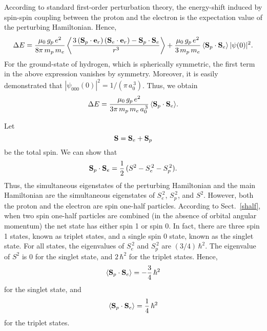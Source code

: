 According to standard first-order perturbation theory, the energy-shift induced
by spin-spin coupling between the proton and the electron is the expectation
value of the perturbing Hamiltonian. Hence,
\begin{equation}
\Delta E = \frac{\mu_0\,g_p\,e^2}{8\pi\,m_p\,m_e}\left\langle\frac{3\,({\bf S}_p\cdot{\bf e}_r)\,({\bf S}_e\cdot{\bf e}_r) - {\bf S}_p\cdot{\bf S}_e}{r^3}\right\rangle+ \frac{\mu_0\,g_p\,e^2}{3\,m_p\,m_e}\,\langle{\bf S}_p\cdot{\bf S}_e\rangle\,|\psi(0)|^2.
\end{equation}
For the ground-state of hydrogen, which is spherically symmetric,
the first term in the above expression vanishes by symmetry. 
Moreover, it is easily demonstrated that $|\psi_{000}(0)|^2=
1/(\pi\,a_0^{\,3})$. Thus, we obtain
\begin{equation}
\Delta E = \frac{\mu_0\,g_p\,e^2}{3\pi\,m_p\,m_e\,a_0^{\,3}}\,\langle{\bf S}_p\cdot{\bf S}_e\rangle.
\end{equation}

Let
\begin{equation}
{\bf S} = {\bf S}_e + {\bf S}_p
\end{equation}
be the total spin. We can show that
\begin{equation}
{\bf S}_p\cdot{\bf S}_e = \frac{1}{2}\,(S^2-S_e^{\,2}-S_p^{\,2}).
\end{equation}
Thus, the simultaneous eigenstates of the perturbing Hamiltonian
and the main Hamiltonian are the simultaneous eigenstates of $S_e^{\,2}$,
$S_p^{\,2}$, and $S^2$. However, both the proton and
the electron are spin one-half particles. According to Sect.~\ref{shalf},
when two spin one-half particles are combined (in the absence of orbital
angular momentum) the net state  has either spin 1 or spin 0.
In fact, there are three spin 1 states, known as triplet states, and a single
spin 0 state, known as the singlet state. For all states,
the eigenvalues of $S_e^{\,2}$ and $S_p^{\,2}$ are $(3/4)\,\hbar^2$.
The eigenvalue of $S^2$ is 0 for the singlet state, and $2\,\hbar^2$
for the triplet states. Hence,
\begin{equation}
\langle {\bf S}_p\cdot{\bf S}_e\rangle = - \frac{3}{4}\,\hbar^2
\end{equation}
for the singlet state, and
\begin{equation}
\langle {\bf S}_p\cdot{\bf S}_e\rangle =  \frac{1}{4}\,\hbar^2
\end{equation}
for the triplet states. 

